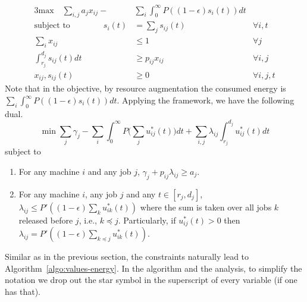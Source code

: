 \documentclass[11pt]{article}
\begin{document}
  \begin{alignat*}{3}
    \text{max} \quad  \sum_{i,j} a_{j} x_{ij} - & \sum_{i}\int_{0}^{\infty} P((1-\epsilon)s_{i}(t)) dt \\
\text{subject to} \qquad \qquad s_{i}(t) &= \sum_{j} s_{ij}(t)	\qquad &\forall i, t \\
					\sum_{i} x_{ij} &\leq 1 \qquad &\forall j \\
					\int_{r_{j}}^{d_{j}} s_{ij}(t)dt & \geq p_{ij}x_{ij}   
											\qquad &\forall i,j \\
					     x_{ij}, s_{ij}(t) &\geq 0 \qquad &\forall i,j,t
  \end{alignat*}
Note that in the objective, by resource augmentation the consumed energy 
is $\sum_{i}\int_{0}^{\infty} P((1-\epsilon)s_{i}(t)) dt$. 
Applying the framework, we have the following dual.
$$
\min \sum_{j} \gamma_{j} - \sum_{i} \int_{0}^{\infty} P\biggl(\sum_{j} u^{*}_{ij}(t) \biggl)dt 
+ \sum_{i,j} \lambda_{ij} \int_{r_{j}}^{d_{j}} u^{*}_{ij}(t)dt 
$$
subject to
\begin{enumerate}
	\item For any machine $i$ and any job $j$, 
	$\gamma_{j} + p_{ij}\lambda_{ij} \geq a_{j}$. 
	\item For any machine $i$, any job $j$ and any $t \in [r_{j},d_{j}]$, 
	$\lambda_{ij} \leq P'((1-\epsilon)\sum_{k} u^{*}_{ik}(t))$ where the sum is taken over all jobs $k$ released before $j$,
	i.e., $k \preceq j$. 
	Particularly, if $u^{*}_{ij}(t) > 0$ then $\lambda_{ij} = P'((1-\epsilon)\sum_{k \preceq j} u^{*}_{ik}(t))$. 
\end{enumerate}


Similar as in the previous section, the constraints naturally lead to Algorithm~\ref{algo:values-energy}.
In the algorithm and the analysis, to simplify the notation we drop out 
the star symbol in the superscript of every variable (if one has that). 
\end{document}
